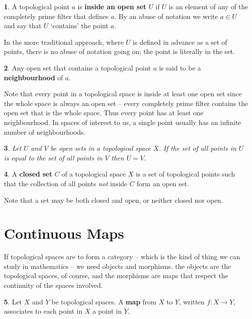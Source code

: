 \documentclass[oneside,english]{amsbook}
\numberwithin{section}{chapter}
\theoremstyle{plain}
\newtheorem{thm}{\protect\theoremname}
\theoremstyle{definition}
\newtheorem{defn}[thm]{\protect\definitionname}
\providecommand{\definitionname}{Definition}
\providecommand{\theoremname}{Theorem}
\begin{document}
\begin{defn} 
	A topological point $a$ is \textbf{inside an open set} $U$ if $U$ is an element of any of the completely prime filter that defines $a$. By an abuse of notation we write $a\in U$ and say that $U$ `contains' the point $a$.
\end{defn} 

In the more traditional approach, where $U$ is defined in advance as a set of points, there is no abuse of notation going on; the point is literally in the set. 

\begin{defn} 
	Any open set that contains a topological point $a$ is said to be a \textbf{neighbourhood} of $a$.
\end{defn} 

Note that every point in a topological space is inside at least one open set since the whole space is always an open set -- every completely prime filter contains the open set that is the whole space. Thus every point has at least one neighbourhood. In spaces of interest to us, a single point usually has an infinite number of neighbourhoods.

\begin{thm} 
	Let $U$ and $V$ be open sets in a topological space $X$. If the set of all points in $U$ is equal to the set of all points in $V$ then $U = V$.
\end{thm} 

\begin{defn} 
	A \textbf{closed set} $C$ of a topological space $X$ is a set of topological points such that the collection of all points \textit{not} inside $C$ form an open set.
\end{defn} 

Note that a set may be both closed and open, or neither closed nor open.

\section{Continuous Maps}

If topological spaces are to form a category -- which is the kind of thing we can study in mathematics -- we need objects and morphisms. the objects are the topological spaces, of course, and the morphisms are maps that respect the continuity of the spaces involved.

\begin{defn} 
	Let $X$ and $Y$ be topological spaces. A \textbf{map} from $X$ to $Y$, written $f:X\to Y$, associates to each point in $X$ a point in $Y$.
\end{defn} 
\end{document}
